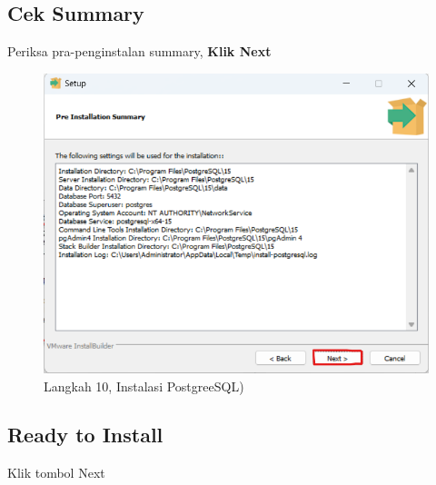 \documentclass[
]{book}
\begin{document}
\hypertarget{cek-summary}{%
\subsection{Cek Summary}\label{cek-summary}}

Periksa pra-penginstalan summary, \textbf{Klik Next}

\begin{figure}

{\centering \includegraphics[width=1\linewidth]{./images/Bab1/Postgree9} 

}

\caption{Langkah 10, Instalasi PostgreeSQL)}\label{fig:install-posrgree10}
\end{figure}

\hypertarget{ready-to-install}{%
\subsection{Ready to Install}\label{ready-to-install}}

Klik tombol Next
\end{document}
